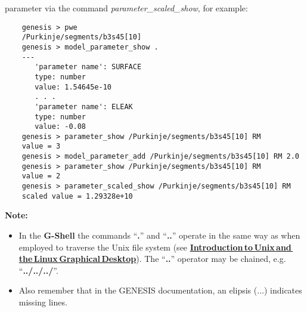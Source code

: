 \documentclass[12pt]{article}
\begin{document}
parameter via the command {\it parameter\_scaled\_show}, for example:
\begin{verbatim}
    genesis > pwe
    /Purkinje/segments/b3s45[10]
    genesis > model_parameter_show .
    ---
       'parameter name': SURFACE
       type: number
       value: 1.54645e-10
       . . .
       'parameter name': ELEAK
       type: number
       value: -0.08
    genesis > parameter_show /Purkinje/segments/b3s45[10] RM
    value = 3    
    genesis > model_parameter_add /Purkinje/segments/b3s45[10] RM 2.0
    genesis > parameter_show /Purkinje/segments/b3s45[10] RM
    value = 2
    genesis > parameter_scaled_show /Purkinje/segments/b3s45[10] RM
    scaled value = 1.29328e+10
\end{verbatim}

{\bf Note:}

\begin{itemize}

\item In the {\bf G-Shell} the commands ``{\bf .}'' and ``{\bf ..}'' operate in the same way as when employed to traverse the Unix file system (see \href{../unix-linux/unix-linux.tex}{\bf Introduction\,to\,Unix\,and\,the\,Linux\,Graphical\,Desktop}). The ``{\bf ..}'' operator may be chained, e.g. ``{\bf ../../../}''.

\item Also remember that in the GENESIS documentation, an elipsis ($\ldots$) indicates missing lines.

\end{itemize}
\end{document}
